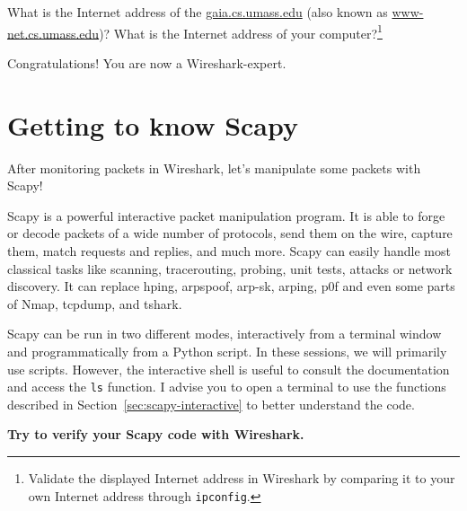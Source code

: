 \documentclass[11pt,a4paper]{article}
\begin{document}
\begin{question}
    What is the Internet address of the \url{gaia.cs.umass.edu} (also known as \url{www-net.cs.umass.edu})? What is the Internet address of your computer?\footnote{Validate the displayed Internet address in Wireshark by comparing it to your own Internet address through \texttt{ipconfig}.}
\end{question}

Congratulations! You are now a Wireshark-expert.

\FloatBarrier
\section{Getting to know Scapy}\label{sec:getting-to-know-scapy}
After monitoring packets in Wireshark, let's manipulate some packets with Scapy!

Scapy is a powerful interactive packet manipulation program. It is able to forge or decode packets of a wide number of protocols, send them on the wire, capture them, match requests and replies, and much more. Scapy can easily handle most classical tasks like scanning, tracerouting, probing, unit tests, attacks or network discovery. It can replace hping, arpspoof, arp-sk, arping, p0f and even some parts of Nmap, tcpdump, and tshark.

Scapy can be run in two different modes, interactively from a terminal window and programmatically from a Python script. 
In these sessions, we will primarily use scripts. However, the interactive shell is useful to consult the documentation and  access the \texttt{ls} function. I advise you to open a terminal to use the functions described in Section~\ref{sec:scapy-interactive} to better understand the code.

\textbf{Try to verify your Scapy code with Wireshark.}
\end{document}
